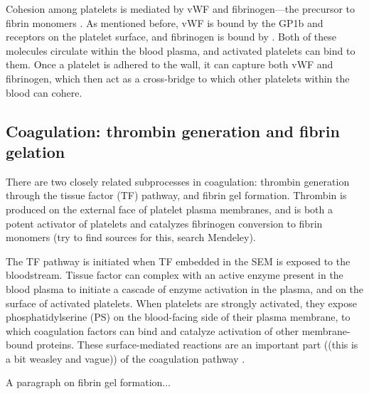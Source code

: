 Cohesion among platelets is mediated by vWF and fibrinogen---the
precursor to fibrin monomers \cite{Fogelson2015}. As mentioned before,
vWF is bound by the GP1b and  receptors on the
platelet surface, and fibrinogen is bound by . Both of
these molecules circulate within the blood plasma, and activated
platelets can bind to them. Once a platelet is adhered to the wall, it
can capture both vWF and fibrinogen, which then act as a cross-bridge
to which other platelets within the blood can cohere.

\subsection{Coagulation: thrombin generation and fibrin gelation}
\label{sec:coagulation}

There are two closely related subprocesses in coagulation: thrombin
generation through the tissue factor (TF) pathway, and fibrin gel
formation. Thrombin is produced on the external face of platelet
plasma membranes, and is both a potent activator of platelets
\cite{Heemskerk2002,Heemskerk2013} and catalyzes fibrinogen conversion
to fibrin monomers (try to find sources for this, search Mendeley).


The TF pathway is initiated when TF embedded in the SEM is exposed to
the bloodstream. Tissue factor can complex with an active enzyme
present in the blood plasma to initiate a cascade of enzyme activation
in the plasma, and on the surface of activated platelets. When
platelets are strongly activated, they expose phosphatidylserine (PS)
on the blood-facing side of their plasma membrane, to which
coagulation factors can bind and catalyze activation of other
membrane-bound proteins. These surface-mediated reactions are an
important part ((this is a bit weasley and vague)) of the coagulation
pathway \cite{Fogelson1998,Kuharsky2001}.

A paragraph on fibrin gel formation...
	



